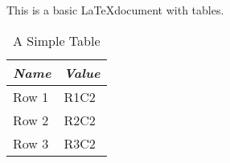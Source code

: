 \documentclass[11pt]{article}
\begin{document}
This is a basic \LaTeX document with tables.

\begin{table}[htbp]
\begin{center}
\begin{tabular}{|| l | l ||}
\hline \hline
\emph{Name} &
\emph{Value} 
\\ \hline \hline
Row 1 & R1C2 \\ \hline
Row 2 & R2C2 \\ \hline
Row 3 & R3C2 \\ \hline

\hline
\end{tabular}
\end{center}
\caption{A Simple Table}
\label{tab:mytab}
\end{table}
\end{document}
